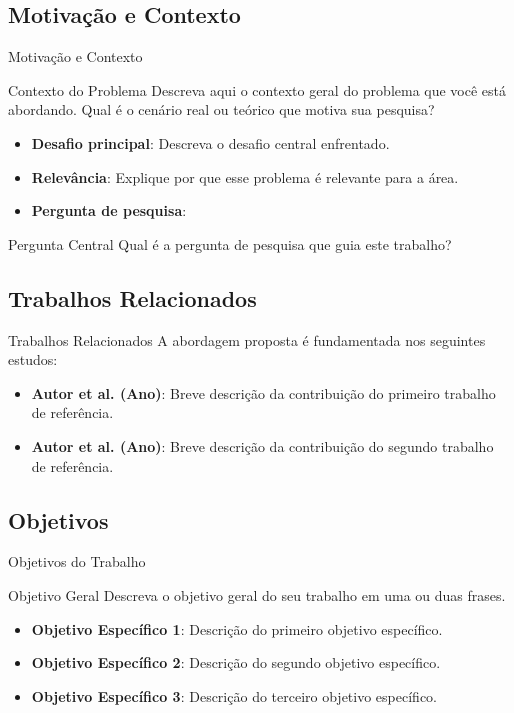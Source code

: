 \subsection{Motivação e Contexto}
\begin{frame}{Motivação e Contexto}
  \begin{block}{Contexto do Problema}
    Descreva aqui o contexto geral do problema que você está abordando. 
    Qual é o cenário real ou teórico que motiva sua pesquisa?
  \end{block}
  
  \begin{itemize}
    \item \textbf{Desafio principal}: Descreva o desafio central enfrentado.
    \item \textbf{Relevância}: Explique por que esse problema é relevante para a área.
    \item \textbf{Pergunta de pesquisa}:
  \end{itemize}

  \begin{exampleblock}{Pergunta Central}
    Qual é a pergunta de pesquisa que guia este trabalho?
  \end{exampleblock}
\end{frame}

\subsection{Trabalhos Relacionados}
\begin{frame}{Trabalhos Relacionados}
  A abordagem proposta é fundamentada nos seguintes estudos:
  
  \begin{itemize}
    \setlength{\itemsep}{15pt}
    \item \textbf{Autor et al. (Ano)}:
      Breve descrição da contribuição do primeiro trabalho de referência.
    \item \textbf{Autor et al. (Ano)}:
      Breve descrição da contribuição do segundo trabalho de referência.
  \end{itemize}
\end{frame}

\subsection{Objetivos}
\begin{frame}{Objetivos do Trabalho}
  \begin{block}{Objetivo Geral}
    Descreva o objetivo geral do seu trabalho em uma ou duas frases.
  \end{block}
  
  \begin{itemize}
    \setlength{\itemsep}{8pt}
    \item \textbf{Objetivo Específico 1}: Descrição do primeiro objetivo específico.
    \item \textbf{Objetivo Específico 2}: Descrição do segundo objetivo específico.
    \item \textbf{Objetivo Específico 3}: Descrição do terceiro objetivo específico.
  \end{itemize}
\end{frame}
